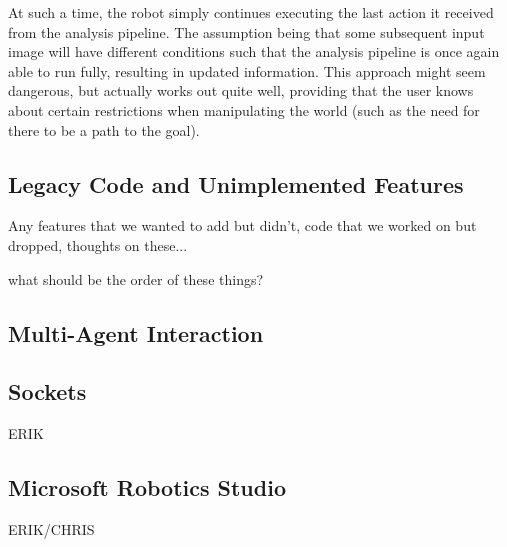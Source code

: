 \documentclass[10pt, abstracton, twocolumn]{scrartcl}
\begin{document}
At such a time, the robot simply continues executing the last action it received from the analysis pipeline. The assumption being that some subsequent input image will have different conditions such that the analysis pipeline is once again able to run fully, resulting in updated information. This approach might seem dangerous, but actually works out quite well, providing that the user knows about certain restrictions when manipulating the world (such as the need for there to be a path to the goal).




\clearpage

\begin{appendices}

\section{Legacy Code and Unimplemented Features}
Any features that we wanted to add but didn't, code that we worked on but dropped, thoughts on these...

what should be the order of these things?

\subsection{Multi-Agent Interaction}
\label{sec:multiagent}

\subsection{Sockets}
ERIK

\subsection{Microsoft Robotics Studio}
ERIK/CHRIS


\end{appendices}
\end{document}
